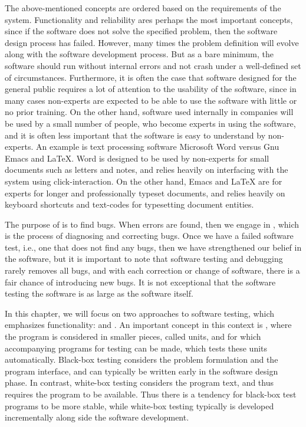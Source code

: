 The above-mentioned concepts are ordered based on the requirements of the system. Functionality and reliability ares perhaps the most important concepts, since if the software does not solve the specified problem, then the software design process has failed. However, many times the problem definition will evolve along with the software development process. But as a bare minimum, the software should run without internal errors and not crash under a well-defined set of circumstances. Furthermore, it is often the case that software designed for the general public requires a lot of attention to the usability of the software, since in many cases non-experts are expected to be able to use the software with little or no prior training. On the other hand, software used internally in companies will be used by a small number of people, who become experts in using the software, and it is often less important that the software is easy to understand by non-experts. An example is text processing software Microsoft Word versus Gnu Emacs and LaTeX. Word is designed to be used by non-experts for small documents such as letters and notes, and relies heavily on interfacing with the system using click-interaction. On the other hand, Emacs and LaTeX are for experts for longer and professionally typeset documents, and relies heavily on keyboard shortcuts and text-codes for typesetting document entities. 

The purpose of  is to find bugs. When errors are found, then we engage in , which is the process of diagnosing and correcting bugs. Once we have a failed software test, i.e., one that does not find any bugs, then we have strengthened our belief in the software, but it is important to note that software testing and debugging rarely removes all bugs, and with each correction or change of software, there is a fair chance of introducing new bugs. It is not exceptional that the software testing the software is as large as the software itself.

In this chapter, we will focus on two approaches to software testing, which emphasizes functionality:  and . An important concept in this context is , where the program is considered in smaller pieces, called units, and for which accompanying programs for testing can be made, which tests these units automatically. Black-box testing considers the problem formulation and the program interface, and can typically be written early in the software design phase. In contrast, white-box testing considers the program text, and thus requires the program to be available. Thus there is a tendency for black-box test programs to be more stable, while white-box testing typically is developed incrementally along side the software development.

